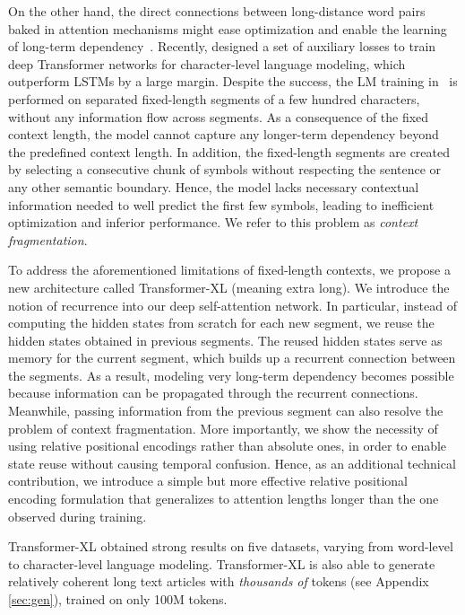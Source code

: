 \documentclass[11pt,a4paper]{article}
\begin{document}
On the other hand, the direct connections between long-distance word pairs baked in attention mechanisms might ease optimization and enable the learning of long-term dependency~\citep{bahdanau2014neural,vaswani2017attention}.
Recently, \citet{al2018character} designed a set of auxiliary losses to train deep Transformer networks for character-level language modeling, which outperform LSTMs by a large margin.
Despite the success, the LM training in~\citet{al2018character} is performed on separated fixed-length segments of a few hundred characters, without any information flow across segments.
As a consequence of the fixed context length, the model cannot capture any longer-term dependency beyond the predefined context length.
In addition, the fixed-length segments are created by selecting a consecutive chunk of symbols without respecting the sentence or any other semantic boundary.
Hence, the model lacks necessary contextual information needed to well predict the first few symbols, leading to inefficient optimization and inferior performance.
We refer to this problem as \textit{context fragmentation}.





To address the aforementioned limitations of fixed-length contexts, we propose a new architecture called Transformer-XL (meaning extra long).
We introduce the notion of recurrence into our deep self-attention network. In particular, instead of computing the hidden states from scratch for each new segment, we reuse the hidden states obtained in previous segments.
The reused hidden states serve as memory for the current segment, which builds up a recurrent connection between the segments.
As a result, modeling very long-term dependency becomes possible because information can be propagated through the recurrent connections.
Meanwhile, passing information from the previous segment can also resolve the problem of context fragmentation.
More importantly, we show the necessity of using relative positional encodings rather than absolute ones, in order to enable state reuse without causing temporal confusion.
Hence, as an additional technical contribution, we introduce a simple but more effective relative positional encoding formulation that generalizes to attention lengths longer than the one observed during training.

Transformer-XL obtained strong results on five datasets, varying from word-level to character-level language modeling.
Transformer-XL is also able to generate relatively coherent long text articles with \textit{thousands of} tokens (see Appendix \ref{sec:gen}), trained on only 100M tokens.
\end{document}
